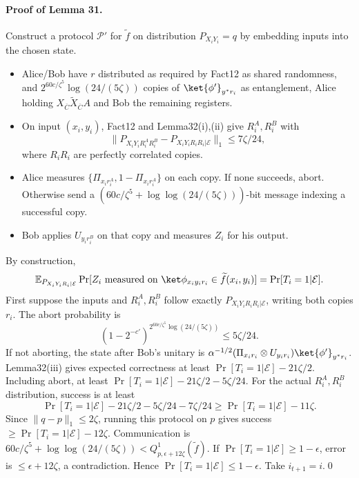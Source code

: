 \paragraph{Proof of Lemma 31.} Construct a protocol $\mathcal P'$ for $\widetilde f$ on distribution $P_{X_iY_i}=q$ by embedding inputs into the chosen state.
\begin{itemize}\item Alice/Bob have $r$ distributed as required by Fact12 as shared randomness, and $2^{60c/\zeta^5}\log(24/(5\zeta))$ copies of $\ket{\phi'}_{y^*r_i}$ as entanglement, Alice holding $X_{\overline C}\widetilde X_{\overline C}A$ and Bob the remaining registers.
\item On input $(x_i,y_i)$, Fact12 and Lemma32(i),(ii) give $R_i^A,R_i^B$ with
\[\|P_{X_iY_iR_i^AR_i^B}-P_{X_iY_iR_iR_i|\mathcal E}\|_1\le7\zeta/24,\]
where $R_iR_i$ are perfectly correlated copies.
\item Alice measures $\{\Pi_{x_ir_i^A},1-\Pi_{x_ir_i^A}\}$ on each copy. If none succeeds, abort. Otherwise send a $(60c/\zeta^5+\log\log(24/(5\zeta)))$-bit message indexing a successful copy.
\item Bob applies $U_{y_ir_i^B}$ on that copy and measures $Z_i$ for his output.\end{itemize}
By construction,
\[\mathbb E_{P_{X_iY_iR_i|\mathcal E}}\Pr[Z_i\text{ measured on }\ket\phi_{x_iy_ir_i}\in\widetilde f(x_i,y_i)]=\Pr[T_i=1|\mathcal E].\]
First suppose the inputs and $R_i^A,R_i^B$ follow exactly $P_{X_iY_iR_iR_i|\mathcal E}$, writing both copies $r_i$. The abort probability is
\[(1-2^{-c'})^{2^{60c/\zeta^5}\log(24/(5\zeta))}\le5\zeta/24.\]
If not aborting, the state after Bob's unitary is $\alpha^{-1/2}(\Pi_{x_ir_i}\otimes U_{y_ir_i})\ket{\phi'}_{y^*r_i}$. Lemma32(iii) gives expected correctness at least $\Pr[T_i=1|\mathcal E]-21\zeta/2$. Including abort, at least $\Pr[T_i=1|\mathcal E]-21\zeta/2-5\zeta/24$. For the actual $R_i^A,R_i^B$ distribution, success is at least
\[\Pr[T_i=1|\mathcal E]-21\zeta/2-5\zeta/24-7\zeta/24\ge\Pr[T_i=1|\mathcal E]-11\zeta.\]
Since $\|q-p\|_1\le2\zeta$, running this protocol on $p$ gives success $\ge\Pr[T_i=1|\mathcal E]-12\zeta$. Communication is $60c/\zeta^5+\log\log(24/(5\zeta))<Q^1_{p,\epsilon+12\zeta}(\widetilde f)$. If $\Pr[T_i=1|\mathcal E]\ge1-\epsilon$, error is $\le\epsilon+12\zeta$, a contradiction. Hence $\Pr[T_i=1|\mathcal E]\le1-\epsilon$. Take $i_{t+1}=i$.\qed
